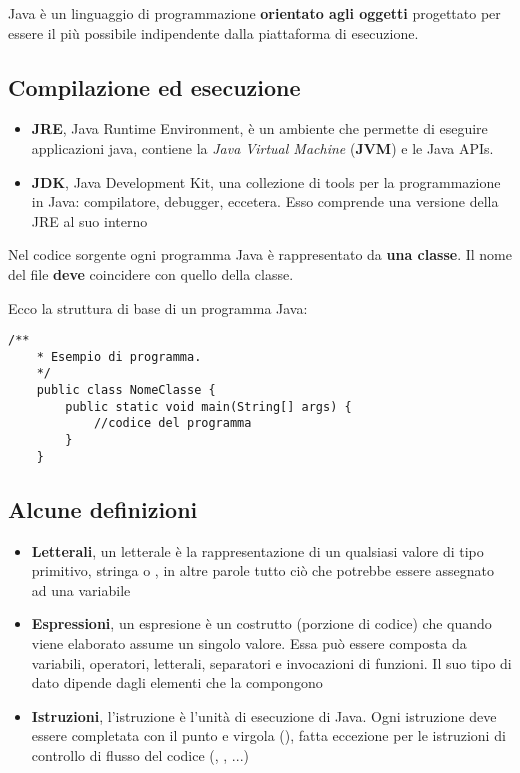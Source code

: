 \documentclass[../main.tex]{subfiles}
\begin{document}
Java è un linguaggio di programmazione \textbf{orientato agli oggetti} progettato per essere il più possibile indipendente dalla
piattaforma di esecuzione.

\subsection{Compilazione ed esecuzione}
\begin{itemize}
    \item \textbf{JRE}, Java Runtime Environment, è un ambiente che permette di eseguire applicazioni java, contiene la
    \textit{Java Virtual Machine} (\textbf{JVM}) e le Java APIs.
    \item \textbf{JDK}, Java Development Kit, una collezione di tools per la programmazione in Java: compilatore, debugger, eccetera.
    Esso comprende una versione della JRE al suo interno
\end{itemize}


Nel codice sorgente ogni programma Java è rappresentato da \textbf{una classe}. Il nome del file \textbf{deve} coincidere con quello
della classe.

Ecco la struttura di base di un programma Java:
\begin{lstlisting}[style=java]
    /**
    * Esempio di programma.
    */
    public class NomeClasse {
        public static void main(String[] args) {
            //codice del programma
        }
    }
\end{lstlisting}

\vspace{1cm}
\subsection{Alcune definizioni}
\begin{itemize}
    \item \textbf{Letterali}, un letterale è la rappresentazione di un qualsiasi valore di tipo primitivo, stringa o , in altre
    parole tutto ciò che potrebbe essere assegnato ad una variabile
    \item \textbf{Espressioni}, un espresione è un costrutto (porzione di codice) che quando viene elaborato assume un singolo valore.
    Essa può essere composta da variabili, operatori, letterali, separatori e invocazioni di funzioni. Il suo tipo di dato dipende dagli
    elementi che la compongono
    \item \textbf{Istruzioni}, l'istruzione è l'unità di esecuzione di Java. Ogni istruzione deve essere completata con il punto e virgola
    (\code{;}), fatta eccezione per le istruzioni di controllo di flusso del codice (, , ...)
\end{itemize}
\end{document}
